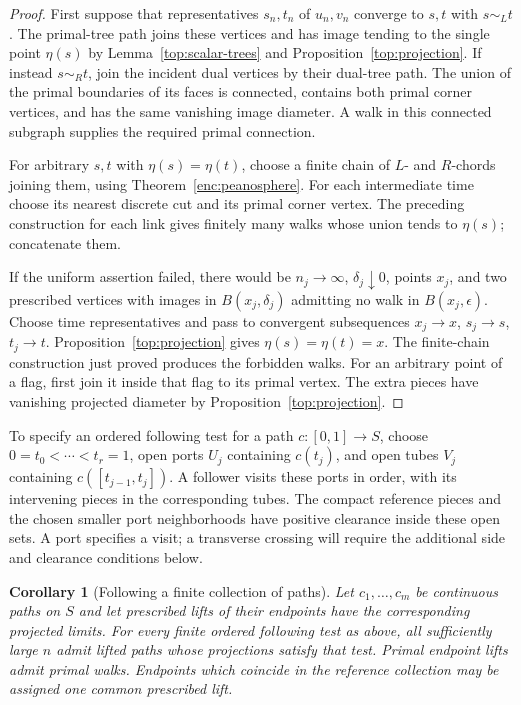 \documentclass[11pt]{article}
\numberwithin{equation}{section}
\newtheorem{corollary}[theorem]{Corollary}
\theoremstyle{definition}
\theoremstyle{remark}
\newcommand{\1}{\mathbf 1}
\begin{document}
\begin{proof}
First suppose that representatives $s_n,t_n$ of $u_n,v_n$ converge to
$s,t$ with $s\sim_L t$.  The primal-tree path joins these vertices and
has image tending to the single point $\eta(s)$ by
Lemma~\ref{top:scalar-trees} and Proposition~\ref{top:projection}.
If instead $s\sim_R t$, join the incident dual vertices by their
dual-tree path.  The union of the primal boundaries of its faces is
connected, contains both primal corner vertices, and has the same
vanishing image diameter.  A walk in this connected subgraph supplies
the required primal connection.

For arbitrary $s,t$ with $\eta(s)=\eta(t)$, choose a finite chain of
$L$- and $R$-chords joining them, using
Theorem~\ref{enc:peanosphere}.  For each intermediate time choose its
nearest discrete cut and its primal corner vertex.  The preceding
construction for each link gives finitely many walks whose union tends
to $\eta(s)$; concatenate them.

If the uniform assertion failed, there would be $n_j\to\infty$,
$\delta_j\downarrow0$, points $x_j$, and two prescribed vertices
with images in $B(x_j,\delta_j)$ admitting no walk in
$B(x_j,\epsilon)$.  Choose time representatives and pass to convergent
subsequences $x_j\to x$, $s_j\to s$, $t_j\to t$.
Proposition~\ref{top:projection} gives
$\eta(s)=\eta(t)=x$.  The finite-chain construction just proved
produces the forbidden walks.  For an arbitrary point of a flag, first
join it inside that flag to its primal vertex.  The extra pieces have
vanishing projected diameter by Proposition~\ref{top:projection}.
\end{proof}

To specify an ordered following test for a path $c:[0,1]\to S$,
choose $0=t_0<\cdots<t_r=1$, open ports $U_j$ containing $c(t_j)$,
and open tubes $V_j$ containing $c([t_{j-1},t_j])$.
A follower visits these ports in order, with its intervening pieces
in the corresponding tubes.  The compact reference pieces and the
chosen smaller port neighborhoods have positive clearance inside
these open sets.  A port specifies a visit; a transverse crossing
will require the additional side and clearance conditions below.

\begin{corollary}[Following a finite collection of paths]
\label{top:path-lifting}
Let $c_1,\ldots,c_m$ be continuous paths on $S$ and let prescribed
lifts of their endpoints have the corresponding projected limits.
For every finite ordered following test as above, all sufficiently
large $n$ admit lifted paths whose projections satisfy that test.
Primal endpoint lifts admit
primal walks.  Endpoints which coincide in the reference collection
may be assigned one common prescribed lift.
\end{corollary}
\end{document}
